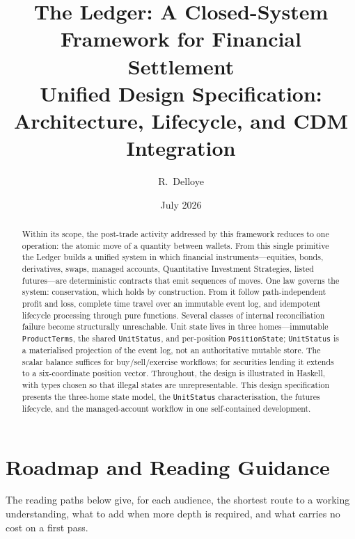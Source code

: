 \documentclass[11pt,a4paper]{article}
\title{The Ledger: A Closed-System Framework for Financial Settlement\\[6pt]
\large Unified Design Specification: Architecture, Lifecycle, and CDM Integration}
\author{R.\ Delloye}
\date{July 2026}
\begin{document}
\maketitle

\begin{abstract}
Within its scope, the post-trade activity addressed by this framework reduces to one operation: the
atomic move of a quantity between wallets. From this single primitive the Ledger builds a unified system
in which financial instruments---equities, bonds, derivatives, swaps, managed accounts, Quantitative
Investment Strategies, listed futures---are deterministic contracts that emit sequences of moves. One law
governs the system: conservation, which holds by construction. From it follow path-independent profit and
loss, complete time travel over an immutable event log, and idempotent lifecycle processing through pure
functions. Several classes of internal reconciliation failure become structurally unreachable. Unit
state lives in three homes---immutable \texttt{ProductTerms}, the shared \texttt{UnitStatus}, and
per-position \texttt{PositionState}; \texttt{UnitStatus} is a materialised projection of the event log,
not an authoritative mutable store. The scalar balance suffices for buy/sell/exercise workflows; for
securities lending it extends to a six-coordinate position vector. Throughout, the design is illustrated
in Haskell, with types chosen so that illegal states are unrepresentable. This design
specification presents the three-home state model, the \texttt{UnitStatus} characterisation,
the futures lifecycle, and the managed-account workflow in one self-contained development.
\end{abstract}

\tableofcontents
\clearpage

\section*{Roadmap and Reading Guidance}

The reading paths below give, for each audience, the shortest route to a working
understanding, what to add when more depth is required, and what carries no cost on a first
pass.
\end{document}

